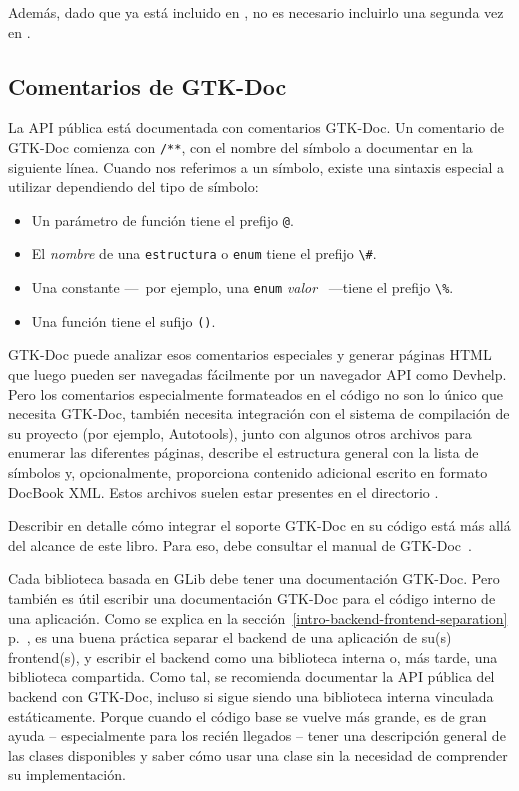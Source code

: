 Además, dado que  ya está incluido en , no es necesario incluirlo una segunda vez en .

\subsection{Comentarios de GTK-Doc}
La API pública está documentada con comentarios GTK-Doc. Un comentario de GTK-Doc comienza con \lstinline{/**}, con el nombre del símbolo a documentar en la siguiente línea. Cuando nos referimos a un símbolo, existe una sintaxis especial a utilizar dependiendo del tipo de símbolo:
\begin{itemize}
    \item Un parámetro de función tiene el prefijo \lstinline{@}.
    \item El \emph{nombre} de una \lstinline{estructura} o \lstinline{enum} tiene el prefijo \lstinline{\#}.
    \item Una constante ---~por ejemplo, una \lstinline{enum} \emph{valor} ~---tiene el prefijo \lstinline{\%}.
    \item Una función tiene el sufijo \lstinline{()}.
\end{itemize}

GTK-Doc puede analizar esos comentarios especiales y generar páginas HTML que luego pueden ser navegadas fácilmente por un navegador API como Devhelp. Pero los comentarios especialmente formateados en el código no son lo único que necesita GTK-Doc, también necesita integración con el sistema de compilación de su proyecto (por ejemplo, Autotools), junto con algunos otros archivos para enumerar las diferentes páginas, describe el estructura general con la lista de símbolos y, opcionalmente, proporciona contenido adicional escrito en formato DocBook XML. Estos archivos suelen estar presentes en el directorio .

Describir en detalle cómo integrar el soporte GTK-Doc en su código está más allá del alcance de este libro. Para eso, debe consultar el manual de GTK-Doc~\cite{gtk-doc}.

Cada biblioteca basada en GLib debe tener una documentación GTK-Doc. Pero también es útil escribir una documentación GTK-Doc para el código interno de una aplicación. Como se explica en la sección~\ref{intro-backend-frontend-separation} p.~\pageref{intro-backend-frontend-separation}, es una buena práctica separar el backend de una aplicación de su(s) frontend(s), y escribir el backend como una biblioteca interna o, más tarde, una biblioteca compartida. Como tal, se recomienda documentar la API pública del backend con GTK-Doc, incluso si sigue siendo una biblioteca interna vinculada estáticamente. Porque cuando el código base se vuelve más grande, es de gran ayuda -- especialmente para los recién llegados -- tener una descripción general de las clases disponibles y saber cómo usar una clase sin la necesidad de comprender su implementación.

